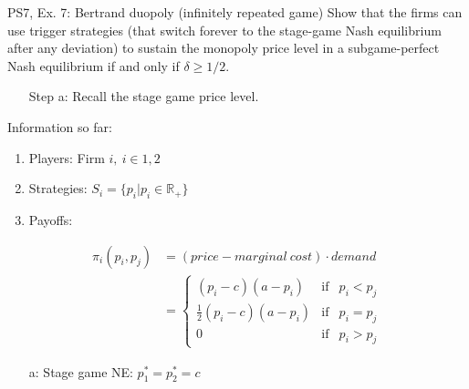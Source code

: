 \begin{frame}{PS7, Ex. 7: Bertrand duopoly (infinitely repeated game)}
    Show that the firms can use trigger strategies (that switch forever to the stage-game Nash equilibrium after any deviation) to sustain the monopoly price level in a subgame-perfect Nash equilibrium if and only if $\delta\geq1/2$.
    \vspace{-6pt}
    \begin{multicols}{2}
      \begin{itemize}
        \item[Step a:] Recall the stage game price level.
      \end{itemize}
      \vspace{-4pt}
      \vfill\null\columnbreak
      Information so far:
      \vspace{-4pt}
      \begin{enumerate}
        \item Players: Firm $i,\ i\in1,2$
        \item Strategies: $S_i=\{p_i|p_i\in\mathbb{R}_+\}$
        \item Payoffs:
      \end{enumerate}
      \vspace{-12pt}
      \begin{align*}
        \pi_i(p_i,p_j)&=(price-marginal\ cost)\cdot demand\\
                      &=\left\{\begin{array}{lcl}
          (p_i-c)(a-p_i)            & \text{if} & p_i<p_j\\
          \frac{1}{2}(p_i-c)(a-p_i) & \text{if} & p_i=p_j\\
          0                         & \text{if} & p_i>p_j
        \end{array}\right.
      \end{align*}
      \vspace{-16pt}
      \begin{itemize}
        \item[a:] Stage game NE: $p_1^*=p_2^*=c$
      \end{itemize}
      \vfill\null
    \end{multicols}
\end{frame}
